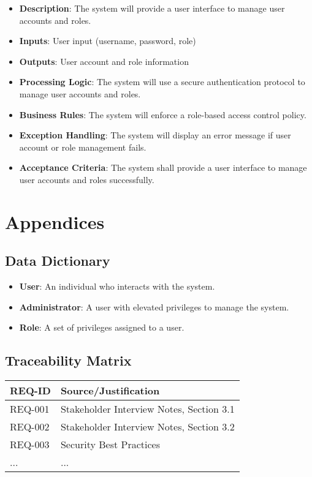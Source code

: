 \documentclass{article}
\begin{document}
\begin{itemize}
\item \textbf{Description}: The system will provide a user interface to manage user accounts and roles.
\item \textbf{Inputs}: User input (username, password, role)
\item \textbf{Outputs}: User account and role information
\item \textbf{Processing Logic}: The system will use a secure authentication protocol to manage user accounts and roles.
\item \textbf{Business Rules}: The system will enforce a role-based access control policy.
\item \textbf{Exception Handling}: The system will display an error message if user account or role management fails.
\item \textbf{Acceptance Criteria}: The system shall provide a user interface to manage user accounts and roles successfully.
\end{itemize}

\section{Appendices}

\subsection{Data Dictionary}
\begin{itemize}
\item \textbf{User}: An individual who interacts with the system.
\item \textbf{Administrator}: A user with elevated privileges to manage the system.
\item \textbf{Role}: A set of privileges assigned to a user.
\end{itemize}

\subsection{Traceability Matrix}
\begin{longtable}{|l|l|}
\hline
REQ-ID & Source/Justification \\
\hline
REQ-001 & Stakeholder Interview Notes, Section 3.1 \\
REQ-002 & Stakeholder Interview Notes, Section 3.2 \\
REQ-003 & Security Best Practices \\
... & ... \\
\hline
\end{longtable}
\end{document}
